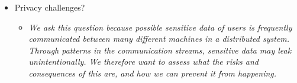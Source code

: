 \begin{itemize}
\begin{itemize}
\begin{itemize}
\begin{itemize}
			\end{itemize}
			\item Privacy challenges?
			\begin{itemize}
				\item \textit{We ask this question because possible sensitive data of users is frequently communicated between many different machines in a distributed system. Through patterns in the communication streams, sensitive data may leak unintentionally. We therefore want to assess what the risks and consequences of this are, and how we can prevent it from happening.}
			\end{itemize}
		\end{itemize}
	\end{itemize}
\end{itemize}
